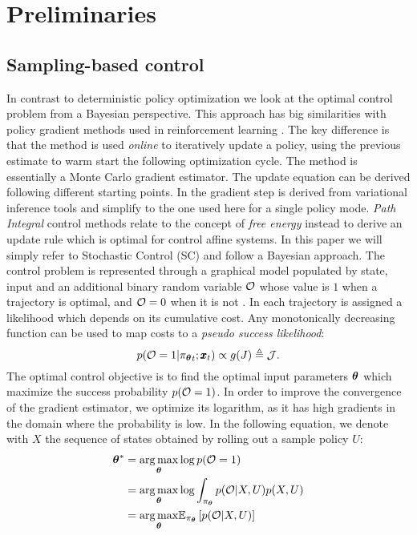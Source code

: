 \section{Preliminaries} \label{sec:theory}

\subsection{Sampling-based control}
In contrast to deterministic policy optimization we look at the optimal control problem from a Bayesian perspective. This approach has big similarities with policy gradient methods used in reinforcement learning \cite{williams1992simple}. The key difference is that the method is used \emph{online} to iteratively update a policy, using the previous estimate to warm start the following optimization cycle. The method is essentially a Monte Carlo gradient estimator. The update equation can be derived following different starting points. In \cite{lambert_stein_2020} the gradient step is derived from variational inference tools and simplify to the one used here for a single policy mode. \emph{Path Integral} control methods relate to the concept of \emph{free energy} instead to derive an update rule which is optimal for control affine systems. In this paper we will simply refer to Stochastic Control (SC) and follow a Bayesian approach. The control problem is represented through a graphical model populated by state, input and an additional binary random variable $\mathcal{O}$ whose value is $1$ when a trajectory is optimal, and $\mathcal{O} = 0$ when it is not \cite{levine2018reinforcement}. In \cite{lambert_stein_2020} each trajectory is assigned a likelihood which depends on its cumulative cost. Any monotonically decreasing function can be used to map costs to a \textit{pseudo success likelihood}:
\begin{equation}
p(\mathcal{O} = 1| {\pi_{\boldsymbol{\theta}}}_{t}; \pmb{x}_t ) \propto g(J) \triangleq \mathcal{J}.
\end{equation}
The optimal control objective is to find the optimal input parameters $\boldsymbol{\theta}$ which maximize the success probability $p(\mathcal{O} = 1)$. In order to improve the convergence of the gradient estimator, we optimize its logarithm, as it has high gradients in the domain where the probability is low. In the following equation, we denote with $X$ the sequence of states obtained by rolling out a sample policy $U$: 
\begin{align}
    \boldsymbol{\theta}^* &= \underset{\boldsymbol{\theta}}{\arg\max} \log p(\mathcal{O} = 1) \\
        &= \underset{\boldsymbol{\theta}}{\arg\max} \log \int_{\pi_{\boldsymbol{\theta}}} p(\mathcal{O} | X, U) p(X, U) \\
        &= \underset{\boldsymbol{\theta}}{\arg\max}  \mathbb{E}_{\pi_{\boldsymbol{\theta}}} \left [p(\mathcal{O} | X, U)\right] \label{eq:input_to_params}
\end{align}
